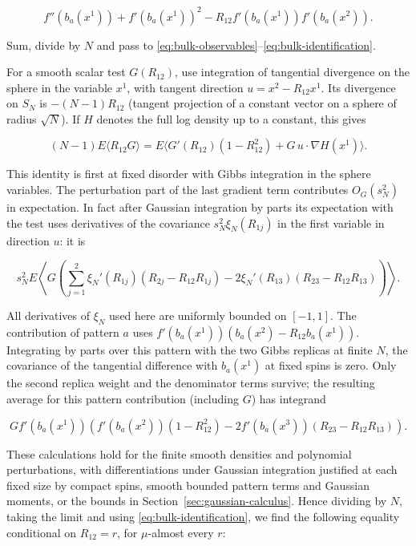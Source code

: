 \documentclass[11pt]{article}
\begin{document}
\begin{equation*}
f''(b_a(x^1))+f'(b_a(x^1))^2-R_{12} f'(b_a(x^1)) f'(b_a(x^2)).
\end{equation*}

Sum, divide by $N$ and pass to \eqref{eq:bulk-observables}--\eqref{eq:bulk-identification}.

For a smooth scalar test $G(R_{12})$, use integration of tangential divergence on the sphere in the variable $x^1$, with tangent direction
$u=x^2-R_{12}x^1$. Its divergence on $S_N$ is $-(N-1)R_{12}$ (tangent projection of a constant vector on a sphere of radius $\sqrt N$). If $H$ denotes the full log density up to a constant, this gives

\begin{equation*}
(N-1)E\langle R_{12}G\rangle
 = E\langle G'(R_{12})(1-R_{12}^2)+G\, u\cdot\nabla H(x^1)\rangle .
\end{equation*}

This identity is first at fixed disorder with Gibbs integration in the sphere variables. The perturbation part of the last gradient term contributes $O_G(s_N^2)$ in expectation. In fact after Gaussian integration by parts its expectation with the test uses derivatives of the covariance $s_N^2\xi_N(R_{1j})$ in the first variable in direction $u$: it is

\begin{equation*}
s_N^2 E\left\langle G\left(\sum_{j=1}^2 \xi_N'(R_{1j})(R_{2j}-R_{12}R_{1j})
              -2\xi_N'(R_{13})(R_{23}-R_{12}R_{13})\right)\right\rangle.
\end{equation*}

All derivatives of $\xi_N$ used here are uniformly bounded on $[-1,1]$. The contribution of pattern $a$ uses $f'(b_a(x^1))(b_a(x^2)-R_{12} b_a(x^1))$. Integrating by parts over this pattern with the two Gibbs replicas at finite $N$, the covariance of the tangential difference with $b_a(x^1)$ at fixed spins is zero. Only the second replica weight and the denominator terms survive; the resulting average for this pattern contribution (including $G$) has integrand

\begin{equation*}
G f'(b_a(x^1))\left(f'(b_a(x^2))(1-R_{12}^2)
         -2 f'(b_a(x^3))(R_{23}-R_{12}R_{13})\right).
\end{equation*}

These calculations hold for the finite smooth densities and polynomial perturbations, with differentiations under Gaussian integration justified at each fixed size by compact spins, smooth bounded pattern terms and Gaussian moments, or the bounds in Section~\ref{sec:gaussian-calculus}. Hence dividing by $N$, taking the limit and using \eqref{eq:bulk-identification}, we find the following equality conditional on $R_{12}=r$, for $\mu$-almost every $r$:
\end{document}
